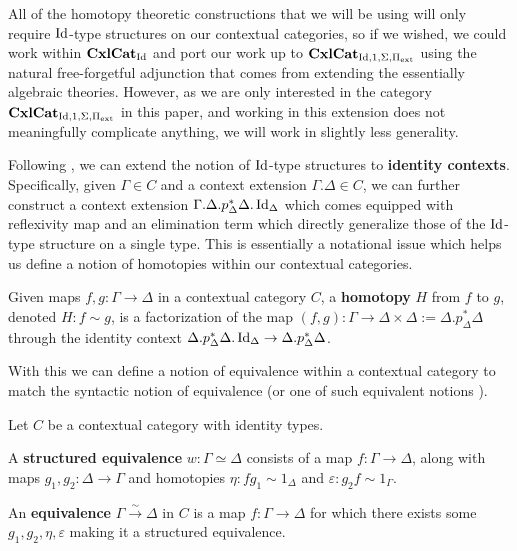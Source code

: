 \documentclass{amsart}
\begin{document}
\begin{rem}
    All of the homotopy theoretic constructions that we will be using will only require $\operatorname{Id}$-type structures on our contextual categories, so if we wished, we could work within $\operatorname{\mathbf{CxlCat}}_{\operatorname{Id}}$ and port our work up to $\operatorname{\mathbf{CxlCat}}_{\operatorname{Id},1,\Sigma,\Pi_{\operatorname{ext}}}$ using the natural free-forgetful adjunction that comes from extending the essentially algebraic theories. However, as we are only interested in the category $\operatorname{\mathbf{CxlCat}}_{\operatorname{Id},1,\Sigma,\Pi_{\operatorname{ext}}}$ in this paper, and working in this extension does not meaningfully complicate anything, we will work in slightly less generality.
\end{rem}

Following \cite[Prop. 3.3.1]{Garner}, we can extend the notion of $\operatorname{Id}$-type structures to \textbf{identity contexts}. Specifically, given $\Gamma\in C$ and a context extension $\Gamma.\Delta\in C$, we can further construct a context extension $\Gamma.\Delta.p_\Delta^*\Delta.\operatorname{Id}_\Delta$ which comes equipped with reflexivity map and an elimination term which directly generalize those of the $\operatorname{Id}$-type structure on a single type. This is essentially a notational issue which helps us define a notion of homotopies within our contextual categories.
\begin{defn}
    Given maps $f,g\colon\Gamma\to\Delta$ in a contextual category $C$, a \textbf{homotopy} $H$ from $f$ to $g$, denoted $H\colon f\sim g$, is a factorization of the map $(f,g)\colon\Gamma\to\Delta\times\Delta:=\Delta.p_\Delta^*\Delta$ through the identity context $\Delta.p_\Delta^*\Delta.\operatorname{Id}_\Delta\to\Delta.p^*_\Delta\Delta$.
\end{defn}

With this we can define a notion of equivalence within a contextual category to match the syntactic notion of equivalence (or one of such equivalent notions \cite[Ch. 4]{hottbook}).

\begin{defn}
    Let $C$ be a contextual category with identity types.
    
    A \textbf{structured equivalence} $w\colon\Gamma\simeq\Delta$ consists of a map $f\colon\Gamma\to\Delta$, along with maps $g_1,g_2\colon\Delta\to\Gamma$ and homotopies $\eta\colon fg_1\sim1_\Delta$ and $\varepsilon\colon g_2f\sim1_\Gamma$.
    
    An \textbf{equivalence} $\Gamma\xrightarrow{\sim}\Delta$ in $C$ is a map $f\colon\Gamma\to\Delta$ for which there exists some $g_1,g_2,\eta,\varepsilon$ making it a structured equivalence.
\end{defn}
\end{document}
